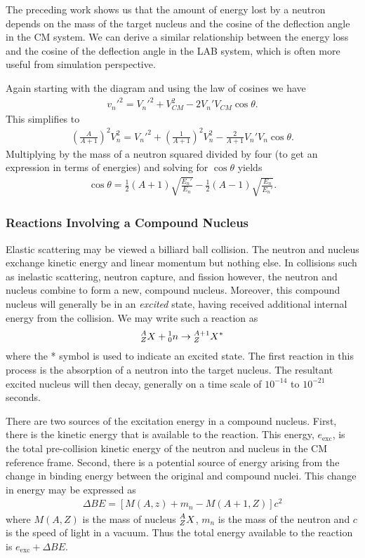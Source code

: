 \documentclass[11pt]{article}
\newcommand\leftidx[3]{{\vphantom{#2}}#1#2#3}
\begin{document}
The preceding work shows us that the amount of energy lost by a neutron depends on the mass of the target nucleus and the cosine of the deflection angle in the CM system.  We can derive a similar relationship between the energy loss and the cosine of the deflection angle in the LAB system, which is often more useful from simulation perspective.

Again starting with the diagram and using the law of cosines we have
\begin{align*}
  v_n'^2 = V_n'^2 + V_{CM}^2 - 2 V_n' V_{CM} \cos\theta.
\end{align*}
This simplifies to 
\begin{align*}
  \left( \frac{A}{A+1} \right)^2 V_n^2 = V_n'^2 + \left( \frac{1}{A+1} \right)^2 V_n^2 - \frac{2}{A+1} V_n' V_n \cos\theta.
\end{align*}
Multiplying by the mass of a neutron squared divided by four (to get an expression in terms of energies) and solving for \(\cos\theta\) yields
\begin{align*}
  \cos\theta = \frac{1}{2}\left( A+1 \right) \sqrt{\frac{E_n'}{E_n}}
             - \frac{1}{2}\left( A-1 \right) \sqrt{\frac{E_n}{E_n'}}.
\end{align*}

\subsubsection{Reactions Involving a Compound Nucleus}
\label{sec:orgheadline7}
Elastic scattering may be viewed a billiard ball collision.  The neutron and nucleus exchange kinetic energy and linear momentum but nothing else.  In collisions such as inelastic scattering, neutron capture, and fission however, the neutron and nucleus combine to form a new, compound nucleus.  Moreover, this compound nucleus will generally be in an \emph{excited} state, having received additional internal energy from the collision.  We may write such a reaction as
\begin{align*}
  \leftidx{^A_Z}{X}{} + \leftidx{^1_0}{n}{} 
  \rightarrow \leftidx{^{A+1}_Z}{X}{^*}
\end{align*}
where the * symbol is used to indicate an excited state.  The first reaction in this process is the absorption of a neutron into the target nucleus.  The resultant excited nucleus will then decay, generally on a time scale of \(10^{-14}\) to \(10^{-21}\) seconds.

There are two sources of the excitation energy in a compound nucleus.  First, there is the kinetic energy that is available to the reaction.  This energy, \(e_{\text{exc}}\), is the total pre-collision kinetic energy of the neutron and nucleus in the CM reference frame.  Second, there is a potential source of energy arising from the change in binding energy between the original and compound nuclei.  This change in energy may be expressed as
\begin{align*}
  \Delta BE = \left[ M(A,z) + m_n - M(A+1,Z) \right] c^2
\end{align*}
where \(M(A,Z)\) is the mass of nucleus \(\leftidx{^A_Z}{X}{}\), \(m_n\) is the mass of the neutron and \(c\) is the speed of light in a vacuum.  Thus the total energy available to the reaction is \(e_{\text{exc}} + \Delta BE\).
\end{document}
